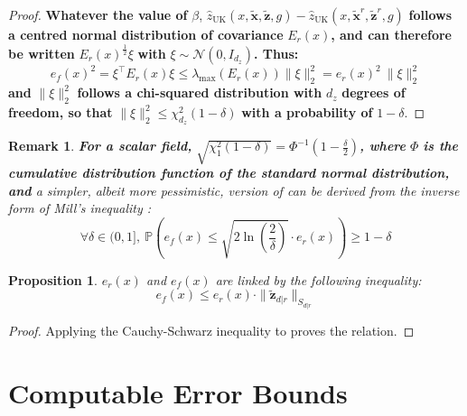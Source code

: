 \documentclass[preprint]{elsarticle}
\newtheorem{proposition}{Proposition}
\newtheorem{remark}{Remark}
\begin{document}
\begin{proof}
    \textbf{Whatever the value of} $\beta$, $\hat{z}_{\mathrm{UK}}(x,\tilde{\mathbf{x}},\tilde{\mathbf{z}},g)-\hat{z}_{\mathrm{UK}}(x,\tilde{\mathbf{x}}^r,\tilde{\mathbf{z}}^r,g)$ \textbf{follows a centred normal distribution of covariance} $E_r(x)$\textbf{, and can therefore be written} $E_r(x)^{\frac{1}{2}}\xi$ \textbf{with} $\xi\sim\mathcal{N}(0,I_{d_z})$\textbf{. Thus:}
    \begin{equation*}
        e_f(x)^2=\xi^\top E_r(x)\xi\leq\lambda_{\max}\left(E_r(x)\right)\|\xi\|_2^2=e_r(x)^2\:\|\xi\|_2^2
    \end{equation*}
    \textbf{and} $\|\xi\|_2^2$ \textbf{follows a chi-squared distribution with} $d_z$ \textbf{degrees of freedom, so that} $\|\xi\|_2^2\leq\chi^2_{d_z}(1-\delta)$ \textbf{with a probability of} $1-\delta$.
\end{proof}

\begin{remark}
    \textbf{For a scalar field,} $\sqrt{\chi^2_1(1-\delta)}=\Phi^{-1}\left(1-\frac{\delta}{2}\right)$\textbf{, where} $\Phi$ \textbf{is the cumulative distribution function of the standard normal distribution, and} a simpler, albeit more pessimistic, version of  can be derived from the inverse form of Mill's inequality \cite{bib:proba-course}:
    \begin{equation*}
        \forall\delta\in(0,1],\:\mathbb{P}\left(e_f(x)\leq\sqrt{2\ln\left(\frac{2}{\delta}\right)}\cdot e_r(x)\right)\geq1-\delta
    \end{equation*}
\end{remark}

\begin{proposition}
    $e_r(x)$ and $e_f(x)$ are linked by the following inequality:
    \begin{equation*}
        e_f(x)\leq e_r(x)\cdot\|\tilde{\mathbf{z}}_{d|r}\|_{S_{d|r}}
    \end{equation*}\label{th:Cauchy-Schwarz_inequality}
    \vspace{-\baselineskip}
\end{proposition}

\begin{proof}
    Applying the Cauchy-Schwarz inequality \cite{bib:matrix-analysis} to  proves the relation.
\end{proof}

\section{Computable Error Bounds}\label{sec:error_bounds}
\end{document}
